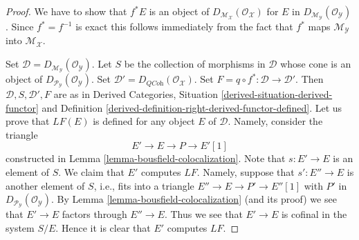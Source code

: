 \begin{proof}
We have to show that $f^*E$ is an object of
$D_{\mathcal{M}_\mathcal{X}}(\mathcal{O}_\mathcal{X})$ for
$E$ in $D_{\mathcal{M}_\mathcal{Y}}(\mathcal{O}_\mathcal{Y})$.
Since $f^* = f^{-1}$ is exact this follows immediately from the fact that
$f^*$ maps $\mathcal{M}_\mathcal{Y}$ into $\mathcal{M}_\mathcal{X}$.

\medskip\noindent
Set $\mathcal{D} = D_{\mathcal{M}_\mathcal{Y}}(\mathcal{O}_\mathcal{Y})$.
Let $S$ be the collection of morphisms in $\mathcal{D}$
whose cone is an object of
$D_{\mathcal{P}_\mathcal{Y}}(\mathcal{O}_\mathcal{Y})$.
Set $\mathcal{D}' = D_{\textit{QCoh}}(\mathcal{O}_\mathcal{X})$.
Set $F = q \circ f^* : \mathcal{D} \to \mathcal{D}'$.
Then $\mathcal{D}, S, \mathcal{D}', F$ are as in
Derived Categories, Situation \ref{derived-situation-derived-functor} and
Definition \ref{derived-definition-right-derived-functor-defined}.
Let us prove that $LF(E)$ is defined for any object $E$ of $\mathcal{D}$.
Namely, consider the triangle
$$
E' \to E \to P \to E'[1]
$$
constructed in Lemma \ref{lemma-bousfield-colocalization}.
Note that $s : E' \to E$ is an element of $S$. We claim that $E'$ computes
$LF$. Namely, suppose that $s' : E'' \to E$ is another element of $S$, i.e.,
fits into a triangle $E'' \to E \to P' \to E''[1]$ with $P'$ in
$D_{\mathcal{P}_\mathcal{Y}}(\mathcal{O}_\mathcal{Y})$. By
Lemma \ref{lemma-bousfield-colocalization} (and its proof)
we see that $E' \to E$ factors through $E'' \to E$. Thus we see that
$E' \to E$ is cofinal in the system $S/E$. Hence it is clear that
$E'$ computes $LF$.


\end{proof}

